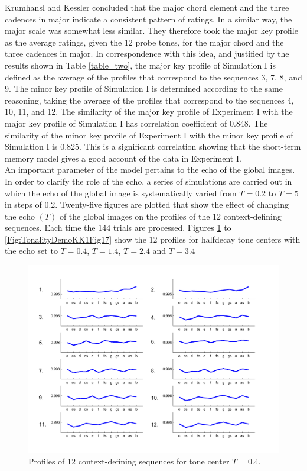 Krumhansl and Kessler concluded that the major chord element and
the three cadences in major indicate a consistent pattern of
ratings. In a similar way, the major scale was somewhat less
similar. They therefore took the major key profile as the average
ratings, given the 12 probe tones, for the major chord and the
three cadences in major. In correspondence with this idea, and
justified by the results shown in Table \ref{table_two}, the major
key profile of Simulation I is defined as the average of the
profiles that correspond to the sequences 3, 7, 8, and 9. The
minor key profile of Simulation I is determined according to the
same reasoning, taking the average of the profiles that correspond
to the sequences 4, 10, 11, and 12. The similarity of the major
key profile of Experiment I with the major key profile of
Simulation I has correlation coefficient of 0.848. The similarity
of the minor key profile of Experiment I with the minor key
profile of Simulation I is 0.825. This is a significant
correlation showing that the short-term memory model gives a good
account of the data in Experiment I.\\ An important parameter of
the model pertains to the echo of the global images. In order to
clarify the role of the echo, a series of simulations are carried
out in which the echo of the global image is systematically
varied from $T=0.2$ to $T=5$ in steps of 0.2. Twenty-five figures
are plotted that show the effect of changing the echo $(T)$ of the
global images on the profiles of the 12 context-defining
sequences. Each time the 144 trials are processed. Figures
\ref{Fig:TonalityDemoKK1Fig2} to \ref{Fig:TonalityDemoKK1Fig17} show the 12 profiles for
halfdecay tone centers with the echo set to $T=0.4$, $T=1.4$, $T=2.4$ and $T=3.4$\\

\begin{figure}[p]
    \centering
    \includegraphics[width=\IPEMDefaultFigureWidth]{Graphics/TonalityDemoKK1Fig2}
    \caption{Profiles of 12 context-defining sequences for tone center $T=0.4.$}
    \label{Fig:TonalityDemoKK1Fig2}
\end{figure}

